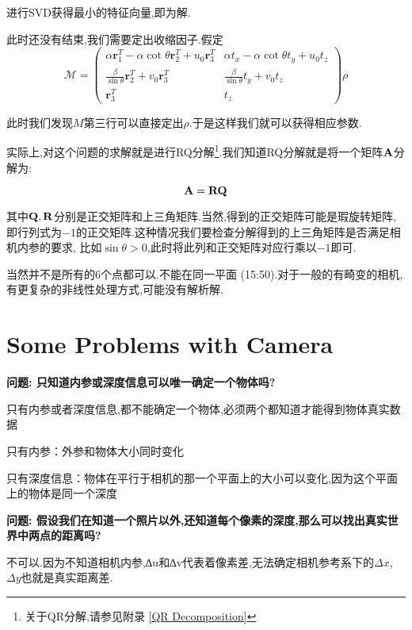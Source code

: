 进行SVD获得最小的特征向量,即为解.

此时还没有结束,我们需要定出收缩因子.假定
\begin{equation}
	\mathcal{M}=\left(\begin{array}{cc}
		\alpha \boldsymbol{r}_{1}^{T}-\alpha \cot \theta \boldsymbol{r}_{2}^{T}+u_{0} \boldsymbol{r}_{3}^{T} & \alpha t_{x}-\alpha \cot \theta t_{y}+u_{0} t_{z} \\
		\frac{\beta}{\sin \theta} \boldsymbol{r}_{2}^{T}+v_{0} \boldsymbol{r}_{3}^{T} & \frac{\beta}{\sin \theta} t_{y}+v_{0} t_{z} \\
		\boldsymbol{r}_{3}^{T} & t_{z}
	\end{array}\right) \rho
\end{equation}

此时我们发现$M$第三行可以直接定出$\rho$.于是这样我们就可以获得相应参数.

实际上,对这个问题的求解就是进行RQ分解\footnote{关于QR分解,请参见附录 \ref{QR Decomposition}}.我们知道RQ分解就是将一个矩阵$\bold{A}$分解为:

\begin{equation}
	\bold{A} =  \bold{R} \bold{Q}
\end{equation}

其中$\bold{Q}, \bold{R}$分别是正交矩阵和上三角矩阵.当然,得到的正交矩阵可能是瑕旋转矩阵,
即行列式为$-1$的正交矩阵.这种情况我们要检查分解得到的上三角矩阵是否满足相机内参的要求,
比如$\sin \theta > 0$,此时将此列和正交矩阵对应行乘以$-1$即可.

当然并不是所有的6个点都可以.不能在同一平面 (15:50).对于一般的有畸变的相机,有更复杂的非线性处理方式,可能没有解析解.

\section{Some Problems with Camera}

\textbf{问题: 只知道内参或深度信息可以唯一确定一个物体吗?}

只有内参或者深度信息,都不能确定一个物体,必须两个都知道才能得到物体真实数据

只有内参：外参和物体大小同时变化

只有深度信息：物体在平行于相机的那一个平面上的大小可以变化,因为这个平面上的物体是同一个深度

\textbf{问题: 假设我们在知道一个照片以外,还知道每个像素的深度,那么可以找出真实世界中两点的距离吗?}

不可以.因为不知道相机内参,∆u和∆v代表着像素差,无法确定相机参考系下的$\Delta x$,$\Delta y$也就是真实距离差.

